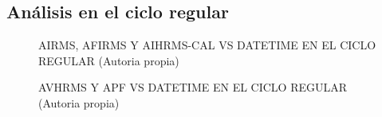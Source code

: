 \subsection{Análisis en el ciclo regular}
\begin{figure}[H]
  \hfill
  \hfill
  \hfill
  \caption{AIRMS, AFIRMS Y AIHRMS-CAL VS DATETIME EN EL CICLO REGULAR (Autoria propia)}
  \end{figure}
\begin{figure}[H]
  \hfill
  \hfill
  \hfill
  \caption{AVHRMS Y APF VS DATETIME EN EL CICLO REGULAR (Autoria propia)}
  \end{figure}
